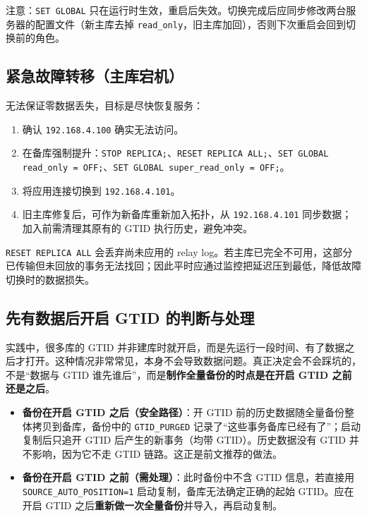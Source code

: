 \documentclass[12pt,UTF8]{ctexbook}
\begin{document}
注意：\texttt{SET GLOBAL} 只在运行时生效，重启后失效。切换完成后应同步修改两台服务器的配置文件（新主库去掉 \texttt{read\_only}，旧主库加回），否则下次重启会回到切换前的角色。

\subsection{紧急故障转移（主库宕机）}

无法保证零数据丢失，目标是尽快恢复服务：

\begin{enumerate}[leftmargin=2cm]
  \item 确认 \texttt{192.168.4.100} 确实无法访问。
  \item 在备库强制提升：\texttt{STOP REPLICA;}、\texttt{RESET REPLICA ALL;}、\texttt{SET GLOBAL read\_only = OFF;}、\texttt{SET GLOBAL super\_read\_only = OFF;}。
  \item 将应用连接切换到 \texttt{192.168.4.101}。
  \item 旧主库修复后，可作为新备库重新加入拓扑，从 \texttt{192.168.4.101} 同步数据；加入前需清理其原有的 GTID 执行历史，避免冲突。
\end{enumerate}

\texttt{RESET REPLICA ALL} 会丢弃尚未应用的 relay log。若主库已完全不可用，这部分已传输但未回放的事务无法找回；因此平时应通过监控把延迟压到最低，降低故障切换时的数据损失。

\subsection{先有数据后开启 GTID 的判断与处理}

实践中，很多库的 GTID 并非建库时就开启，而是先运行一段时间、有了数据之后才打开。这种情况非常常见，本身不会导致数据问题。真正决定会不会踩坑的，不是“数据与 GTID 谁先谁后”，而是\textbf{制作全量备份的时点是在开启 GTID 之前还是之后}。

\begin{itemize}[leftmargin=2cm]
  \item \textbf{备份在开启 GTID 之后（安全路径）}：开 GTID 前的历史数据随全量备份整体拷贝到备库，备份中的 \texttt{GTID\_PURGED} 记录了“这些事务备库已经有了”；启动复制后只追开 GTID 后产生的新事务（均带 GTID）。历史数据没有 GTID 并不影响，因为它不走 GTID 链路。这正是前文推荐的做法。
  \item \textbf{备份在开启 GTID 之前（需处理）}：此时备份中不含 GTID 信息，若直接用 \texttt{SOURCE\_AUTO\_POSITION=1} 启动复制，备库无法确定正确的起始 GTID。应在开启 GTID 之后\textbf{重新做一次全量备份}并导入，再启动复制。
\end{itemize}
\end{document}

